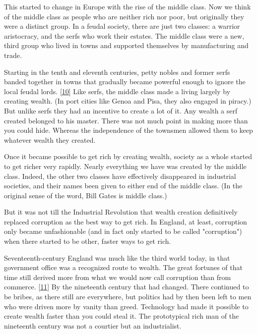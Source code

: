 This
                  started to change in Europe with the rise of the middle class.
                  Now we think of the middle class as people who are neither
                  rich nor poor, but originally they were a distinct group. In a
                  feudal society, there are just two classes: a warrior
                  aristocracy, and the serfs who work their estates. The middle
                  class were a new, third group who lived in towns and supported
                  themselves by manufacturing and trade.

Starting in
                  the tenth and eleventh centuries, petty nobles and former
                  serfs banded together in towns that gradually became powerful
                  enough to ignore the local feudal lords.
                  [\href{\#f10n}{10}]
                  Like serfs, the middle class made a living largely by creating
                  wealth. (In port cities like Genoa and Pisa, they also engaged
                  in piracy.) But unlike serfs they had an incentive to create a
                  lot of it. Any wealth a serf created belonged to his master.
                  There was not much point in making more than you could hide.
                  Whereas the independence of the townsmen allowed them to keep
                  whatever wealth they created.

Once it became
                  possible to get rich by creating wealth, society as a whole
                  started to get richer very rapidly. Nearly everything we have
                  was created by the middle class. Indeed, the other two classes
                  have effectively disappeared in industrial societies, and
                  their names been given to either end of the middle class. (In
                  the original sense of the word, Bill Gates is middle
                  class.)

But it was not till the Industrial
                  Revolution that wealth creation definitively replaced
                  corruption as the best way to get rich. In England, at least,
                  corruption only became unfashionable (and in fact only started
                  to be called "corruption") when there started to be other,
                  faster ways to get rich.

Seventeenth-century
                  England was much like the third world today, in that
                  government office was a recognized route to wealth. The great
                  fortunes of that time still derived more from what we would
                  now call corruption than from commerce.
                  [\href{\#f11n}{11}]
                  By the nineteenth century that had changed. There continued to
                  be bribes, as there still are everywhere, but politics had by
                  then been left to men who were driven more by vanity than
                  greed. Technology had made it possible to create wealth faster
                  than you could steal it. The prototypical rich man of the
                  nineteenth century was not a courtier but an industrialist.

